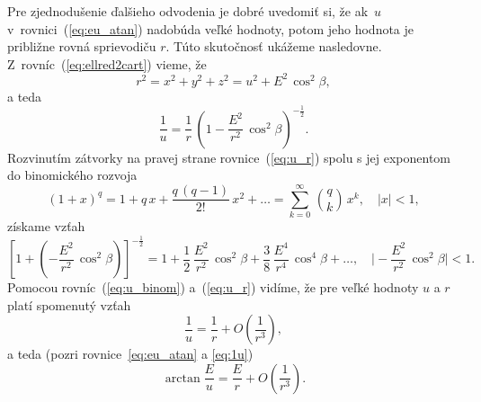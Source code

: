 \documentclass[a4paper,12pt]{book}
\begin{document}
Pre zjednodušenie ďalšieho odvodenia je dobré uvedomiť si, že ak~$u$ 
v~rovnici~(\ref{eq:eu_atan}) nadobúda veľké hodnoty, potom jeho hodnota je 
približne rovná sprievodiču $r$.  Túto skutočnosť ukážeme nasledovne.  
Z~rovníc~(\ref{eq:ellred2cart}) vieme, že
%
\begin{equation}
r^2 = x^2 + y^2 + z^2 = u^2 + E^2 \, \cos^2\beta{,}
\end{equation}
%
a teda
%
\begin{equation}
\label{eq:u_r}
\frac{1}{u} = \frac{1}{r} \, \left( 1 - \frac{E^2}{r^2} \, \cos^2\beta 
\right)^{-\frac{1}{2}}{.}
\end{equation}
%
Rozvinutím zátvorky na pravej strane rovnice~(\ref{eq:u_r}) spolu s jej 
exponentom do binomického rozvoja \parencite[pozri napríklad][]{Gradshteyn2007}
%
\begin{equation}
(1 + x)^q = 1 + q \, x + \frac{q \, (q - 1)}{2!} \, x^2 + \dots = \sum_{k 
= 0}^{\infty} \, \binom{q}{k} \, x^k{,} \quad | x | < 1{,}
\end{equation}
%
získame vzťah
%
\begin{equation}
\label{eq:u_binom}
\left[ 1 + \left( - \frac{E^2}{r^2} \, \cos^2\beta \right) 
\right]^{-\frac{1}{2}} = 1 + \frac{1}{2} \, \frac{E^2}{r^2} \, \cos^2\beta 
+ \frac{3}{8} \, \frac{E^4}{r^4} \, \cos^4\beta + \dots{,} \quad \bigg\lvert 
-\frac{E^2}{r^2} \, \cos^2\beta \bigg\rvert < 1{.}
\end{equation}
%
Pomocou rovníc~(\ref{eq:u_binom}) a~(\ref{eq:u_r}) vidíme, že pre veľké hodnoty 
$u$ a $r$ platí spomenutý vzťah
%
\begin{equation}
\label{eq:1u}
\frac{1}{u} = \frac{1}{r} + O\left( \frac{1}{r^3} \right){,}
\end{equation}
%
a teda (pozri rovnice~\ref{eq:eu_atan} a \ref{eq:1u})
%
\begin{equation}
\label{eq:arctan_eu_r}
\arctan\frac{E}{u} = \frac{E}{r} + O\left( \frac{1}{r^3} \right){.}
\end{equation}
\end{document}
